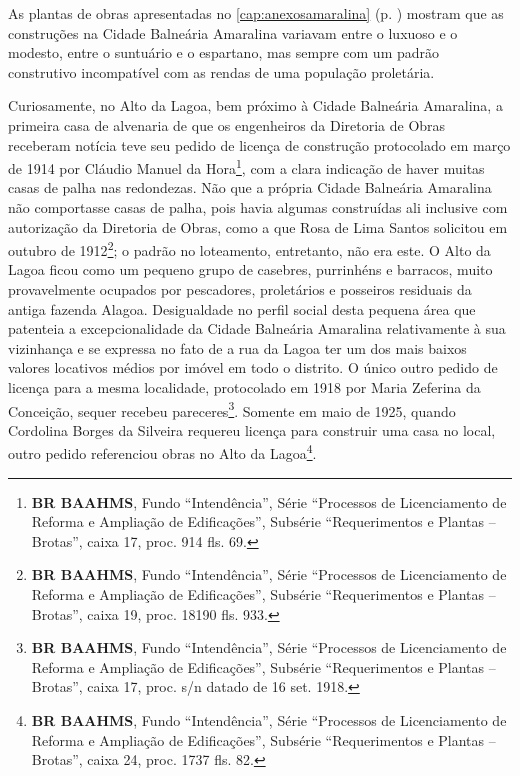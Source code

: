 As plantas de obras apresentadas no \autoref{cap:anexosamaralina} (p. \pageref{cap:anexosamaralina}) mostram que as construções na Cidade Balneária Amaralina variavam entre o luxuoso e o modesto, entre o suntuário e o espartano, mas sempre com um padrão construtivo incompatível com as rendas de uma população proletária. 


Curiosamente, no Alto da Lagoa, bem próximo à Cidade Balneária Amaralina, a primeira casa de alvenaria de que os engenheiros da Diretoria de Obras receberam notícia teve seu pedido de licença de construção protocolado em março de 1914 por Cláudio Manuel da Hora\footnote{\textbf{BR BAAHMS}, Fundo ``Intendência'', Série ``Processos de Licenciamento de Reforma e Ampliação de Edificações'', Subsérie ``Requerimentos e Plantas -- Brotas'', caixa 17, proc. 914 fls. 69.}, com a clara indicação de haver muitas casas de palha nas redondezas. Não que a própria Cidade Balneária Amaralina não comportasse casas de palha, pois havia algumas construídas ali inclusive com autorização da Diretoria de Obras, como a que Rosa de Lima Santos solicitou em outubro de 1912\footnote{\textbf{BR BAAHMS}, Fundo ``Intendência'', Série ``Processos de Licenciamento de Reforma e Ampliação de Edificações'', Subsérie ``Requerimentos e Plantas -- Brotas'', caixa 19, proc. 18190 fls. 933.}; o padrão no loteamento, entretanto, não era este. O Alto da Lagoa ficou como um pequeno grupo de casebres, purrinhéns e barracos, muito provavelmente ocupados por pescadores, proletários e posseiros residuais da antiga fazenda Alagoa. Desigualdade no perfil social desta pequena área que patenteia a excepcionalidade da Cidade Balneária Amaralina relativamente à sua vizinhança e se expressa no fato de a rua da Lagoa ter um dos mais baixos valores locativos médios por imóvel em todo o distrito. O único outro pedido de licença para a mesma localidade, protocolado em 1918 por Maria Zeferina da Conceição, sequer recebeu pareceres\footnote{\textbf{BR BAAHMS}, Fundo ``Intendência'', Série ``Processos de Licenciamento de Reforma e Ampliação de Edificações'', Subsérie ``Requerimentos e Plantas -- Brotas'', caixa 17, proc. s/n datado de 16 set. 1918.}. Somente em maio de 1925, quando Cordolina Borges da Silveira requereu licença para construir uma casa no local, outro pedido referenciou obras no Alto da Lagoa\footnote{\textbf{BR BAAHMS}, Fundo ``Intendência'', Série ``Processos de Licenciamento de Reforma e Ampliação de Edificações'', Subsérie ``Requerimentos e Plantas -- Brotas'', caixa 24, proc. 1737 fls. 82.}.


